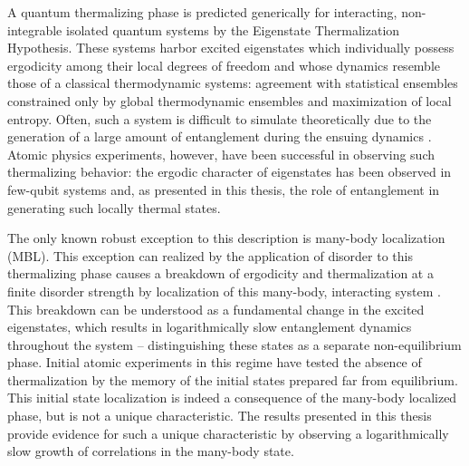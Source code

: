 
A quantum thermalizing phase is predicted generically for interacting, non-integrable isolated quantum systems by the Eigenstate Thermalization Hypothesis\cite{Deutsch1991,Rigol2008,Jensen1985,Srednicki1994}. These systems harbor excited eigenstates which individually possess ergodicity among their local degrees of freedom and whose dynamics resemble those of a classical thermodynamic systems: agreement with statistical ensembles constrained only by global thermodynamic ensembles\cite{Jensen1985,Deutsch1991,Srednicki1994,Rigol2008} and maximization of local entropy. Often, such a system is difficult to simulate theoretically due to the generation of a large amount of entanglement during the ensuing dynamics \cite{Calabrese2005,Amico2008,Daley2012,Schachenmayer2013}. Atomic physics experiments, however, have been successful in observing such thermalizing behavior: the ergodic character of eigenstates has been observed in few-qubit systems\cite{Neill2016} and, as presented in this thesis, the role of entanglement\cite{Santos2012, Deutsch2013} in generating such locally thermal states\cite{Kaufman2016}.

The only known robust exception to this description is many-body localization (MBL)\cite{Nandkishore2015,DAlessio2016}. This exception can realized by the application of disorder to this thermalizing phase causes a breakdown of ergodicity and thermalization at a finite disorder strength by localization of this many-body, interacting system \cite{Anderson1958,Schwartz2007,Billy2008,Roati2008,Lahini2008,Deissler2010,Gadway2011,Kondov2011,Jendrzejewski2012,DErrico2008}. This breakdown can be understood as a fundamental change in the excited eigenstates, which results in  logarithmically slow entanglement dynamics throughout the system -- distinguishing these states as a separate non-equilibrium phase\cite{Pal2010,Huse2013}. Initial atomic experiments in this regime have tested the absence of thermalization by the memory of the initial states prepared far from equilibrium\cite{Schreiber2015,Smith2016,Choi2016}. This initial state localization is indeed a consequence of the many-body localized phase, but is not a unique characteristic\cite{Anderson1958,Nandkishore2015}. The results presented in this thesis provide evidence for such a unique characteristic by observing a logarithmically slow growth of correlations in the many-body state\cite{Lukin2019}. 

